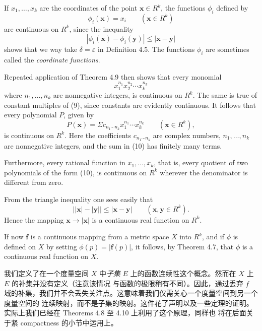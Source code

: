 \documentclass[../poma-notes.tex]{subfiles}
\begin{document}
\begin{examples}
  If $x_1, \dots, x_k$ are the coordinates of the point $\mathbf{x} \in R^k$, the functions $\phi_i$ defined by
  \begin{equation}
    \phi_i(\mathbf{x}) = x_i \qquad (\mathbf{x} \in R^k)
  \end{equation}
  are continuous on $R^k$, since the inequality
  \[
    |\phi_i(\mathbf{x}) - \phi_i(\mathbf{y})| \le |\mathbf{x} - \mathbf{y}|
  \]
  shows that we way take $\delta = \varepsilon$ in Definition 4.5. The functions $\phi_i$ are sometimes called
  the \textit{coordinate functions}.

  Repeated application of Theorem 4.9 then shows that every monomial
  \begin{equation}
    x_1^{n_1} x_2^{n_2} \cdots x_k^{n_k}
  \end{equation}
  where $n_1, \dots, n_k$ are nonnegative integers, is continuous on $R^k$. The same is true of constant multiples
  of (9), since constants are evidently continuous. It follows that every polynomial $P$, given by
  \begin{equation}
    P(\mathbf{x}) = \Sigma c_{n_1 \cdots n_k} x_1^{n_1} \cdots x_k^{n_k} \qquad (\mathbf{x} \in R^k),
  \end{equation}
  is continuous on $R^k$. Here the coefficients $c_{n_1 \cdots n_k}$ are complex numbers, $n_1, \dots, n_k$ are
  nonnegative integers, and the sum in (10) has finitely many terms.

  Furthermore, every rational function in $x_1, \dots, x_k$, that is, every quotient of two polynomials of the
  form (10), is continuous on $R^k$ wherever the denominator is different from zero.

  From the triangle inequality one sees easily that
  \begin{equation}
    \bigl||\mathbf{x}| - |\mathbf{y}|\bigr| \le |\mathbf{x} - \mathbf{y}|\qquad (\mathbf{x}, \mathbf{y} \in R^k).
  \end{equation}
  Hence the mapping $\mathbf{x} \to |\mathbf{x}|$ is a continuous real function on $R^k$.

  If now $\mathbf{f}$ is a continuous mapping from a metric space $X$ into $R^k$, and if $\phi$ is defined on
  $X$ by setting $\phi(p) = |\mathbf{f}(p)|$, it follows, by Theorem 4.7, that $\phi$ is a continuous real
  function on $X$.
\end{examples}


\begin{remark}
  我们定义了在一个度量空间 $X$ 中\textit{子集} $E$ 上的函数连续性这个概念。然而在 $X$ 上 $E$ 的补集并没有定义（注意该情况
  与函数的极限稍有不同）。因此，通过丢弃 $f$ 域的补集，我们并不会丢失关注点。这意味着我们仅需关心一个度量空间到另一个度量空间的
  连续映射，而不是子集的映射。这件花了声明以及一些定理的证明。实际上我们已经在 Theorems 4.8 至 4.10 上利用了这个原理，同样也
  将在后面关于紧 compactness 的小节中运用上。
\end{remark}
\end{document}
